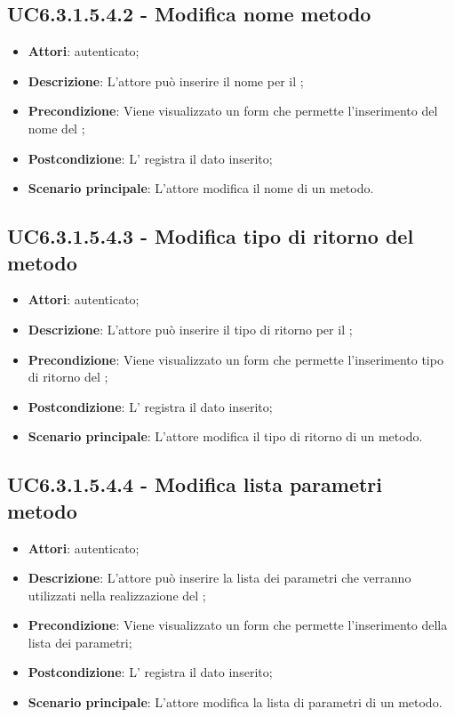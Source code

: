 \subsection{UC6.3.1.5.4.2 - Modifica nome metodo}
\label{ssec:UC6.3.1.5.4.2}
\begin{itemize}
\item \textbf{Attori}:  autenticato;
\item \textbf{Descrizione}: L'attore può inserire il nome per il ;
\item \textbf{Precondizione}: Viene visualizzato un form che permette l'inserimento del nome del ;
\item \textbf{Postcondizione}: L' registra il dato inserito;
\item \textbf{Scenario principale}: L'attore modifica il nome di un metodo.
\end{itemize}
\subsection{UC6.3.1.5.4.3 - Modifica tipo di ritorno del metodo}
\label{ssec:UC6.3.1.5.4.3}
\begin{itemize}
\item \textbf{Attori}:  autenticato;
\item \textbf{Descrizione}: L'attore può inserire il tipo di ritorno per il ;
\item \textbf{Precondizione}: Viene visualizzato un form che permette l'inserimento tipo di ritorno del ;
\item \textbf{Postcondizione}: L' registra il dato inserito;
\item \textbf{Scenario principale}: L'attore modifica il tipo di ritorno di un metodo.
\end{itemize}
\subsection{UC6.3.1.5.4.4 - Modifica lista parametri metodo}
\label{ssec:UC6.3.1.5.4.4}
\begin{itemize}
\item \textbf{Attori}:  autenticato;
\item \textbf{Descrizione}: L'attore può inserire la lista dei parametri che verranno utilizzati nella realizzazione del ;
\item \textbf{Precondizione}: Viene visualizzato un form che permette l'inserimento della lista dei parametri;
\item \textbf{Postcondizione}: L' registra il dato inserito;
\item \textbf{Scenario principale}: L'attore modifica la lista di parametri di un metodo.
\end{itemize}
